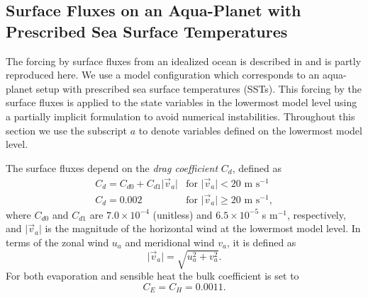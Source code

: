 \documentclass[times,doublespace]{fldauth}
\begin{document}
{\begin{appendix}

\section{Surface Fluxes on an Aqua-Planet with Prescribed Sea Surface Temperatures} \label{sec:OceanSurfaceFluxes}

The forcing by surface fluxes from an idealized ocean is described in \cite{reed2012idealized} and is partly reproduced here. We use a model configuration which corresponds to an aqua-planet setup with prescribed sea surface temperatures (SSTs). This forcing by the surface fluxes is applied to the state variables in the lowermost model level using a partially implicit formulation to avoid numerical instabilities.  Throughout this section we use the subscript $a$ to denote variables defined on the lowermost model level.

The surface fluxes depend on the \textit{drag coefficient} $C_d$, defined as
\begin{equation} \label{eq:DragCoefficient}
\begin{array}{ll}
C_d = C_{d0} + C_{d1} \vert \vec{v}_a \vert & \mbox{for $\vert \vec{v}_a \vert < 20$ m s$^{-1}$} \\ 
C_d = 0.002 & \mbox{for $\vert \vec{v}_a \vert \geq 20$ m s$^{-1}$}, 
\end{array}
\end{equation}
where $C_{d0}$ and $C_{d1}$ are $7.0 \times 10^{-4}$ (unitless) and $6.5 \times 10^{-5}$ s m$^{-1}$, respectively, and $\vert \vec{v}_a \vert$ is the magnitude of the horizontal wind at the lowermost model level.  In terms of the zonal wind $u_a$ and meridional wind $v_a$, it is defined as
\begin{equation}
\vert \vec{v}_a \vert = \sqrt{u_a^2 + v_a^2}.
\end{equation}  For both evaporation and sensible heat the bulk coefficient is set to
\begin{equation} \label{eq:BulkTransferCoefficient}
C_E = C_H = 0.0011.
\end{equation}


\end{appendix}}
\end{document}
